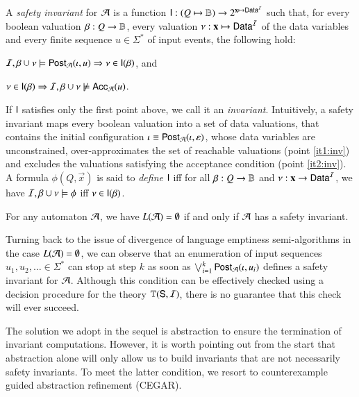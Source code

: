 \documentclass[10pt]{llncs}
\begin{document}
A \emph{safety invariant} for $\mathcal{A}$ is a function $\mathsf{I} : (Q \mapsto
\mathbb{B}) \rightarrow 2^{\mathbf x \mapsto \mathsf{Data}^{\mathcal{I}}}$ such that, for every
boolean valuation $\beta : Q \rightarrow \mathbb{B}$, every valuation $\nu
: \mathbf x \mapsto \mathsf{Data}^{\mathcal{I}}$ of the data variables and every finite
sequence $u \in \Sigma^*$ of input events, the following
hold: \begin{compactenum}
%
\item\label{it1:inv} $\mathcal{I},\beta \cup \nu \models \mathsf{Post}_{\mathcal{A}}(\iota,u)
  \Rightarrow \nu \in \mathsf{I}(\beta)$, and
%
\item\label{it2:inv} $\nu \in \mathsf{I}(\beta) \Rightarrow \mathcal{I},\beta \cup
  \nu \not\models \mathsf{Acc}_{\mathcal{A}}(u)$.
\end{compactenum}
If $\mathsf{I}$ satisfies only the first point above, we call it an
\emph{invariant}. Intuitively, a safety invariant maps every boolean
valuation into a set of data valuations, that contains the initial
configuration $\iota \equiv \mathsf{Post}_{\mathcal{A}}(\iota,\varepsilon)$, whose data
variables are unconstrained, over-approximates the set of reachable
valuations (point \ref{it1:inv}) and excludes the valuations satisfying the
acceptance condition (point \ref{it2:inv}).  A formula $\phi(Q,\vec{x})$
is said to \emph{define} $\mathsf{I}$ iff for all $\beta: Q \rightarrow \mathbb{B}$ and
$\nu : \mathbf x \rightarrow \mathsf{Data}^{\mathcal{I}}$, we have $\mathcal{I},\beta\cup\nu \models
\phi$ iff $\nu \in \mathsf{I}(\beta)$.

\begin{lemma}\label{lemma:safety-invariant}
  For any automaton $\mathcal{A}$, we have $L(\mathcal{A}) = \emptyset$ if and only if
  $\mathcal{A}$ has a safety invariant.
\end{lemma}

Turning back to the issue of divergence of language emptiness
semi-algorithms in the case $L(\mathcal{A}) = \emptyset$, we can observe that
an enumeration of input sequences $u_1,u_2,\ldots \in \Sigma^*$ can
stop at step $k$ as soon as $\bigvee_{i=1}^k \mathsf{Post}_{\mathcal{A}}(\iota,u_i)$
defines a safety invariant for $\mathcal{A}$. Although this condition can be
effectively checked using a decision procedure for the theory
$\mathbb{T}(\mathsf{S},\mathcal{I})$, there is no guarantee that this check will ever
succeed.

The solution we adopt in the sequel is abstraction to ensure the
termination of invariant computations. However, it is worth pointing
out from the start that abstraction alone will only allow us to build
invariants that are not necessarily safety invariants. To meet the
latter condition, we resort to counterexample guided abstraction
refinement (CEGAR).
\end{document}
